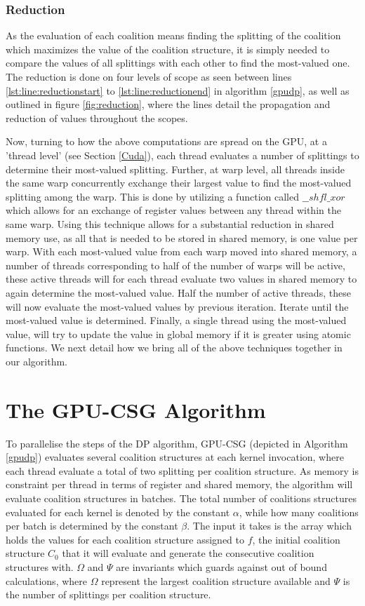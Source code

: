 \documentclass{llncs}
\begin{document}
\subsubsection{Reduction} \label{reduction} %
As the evaluation of each coalition  means finding the splitting  of the coalition  which maximizes the value of the coalition structure, it is simply needed to compare the values of all splittings with each other to find the most-valued one.  The reduction is done on four levels of scope as seen between lines \ref{lst:line:reductionstart} to \ref{lst:line:reductionend} in algorithm \ref{gpudp},
as well as outlined in figure \ref{fig:reduction}, where the lines detail the propagation and reduction of values throughout the scopes.

Now, turning to how the above computations are spread on the GPU, at a 'thread level' (see Section \ref{Cuda}), each thread evaluates a number of splittings to determine their most-valued splitting. Further, at warp level, all threads inside the same warp concurrently exchange their largest value to find the most-valued splitting among the warp. This is done by utilizing a function called $\_\_shfl\_xor$ which allows for an exchange of register values between any thread within the same warp.
Using this technique allows for a substantial reduction in shared memory use, as all that is needed to be stored in shared memory, is one value per warp.  With each most-valued value from each warp moved into shared memory, a number of threads corresponding to half of the number of warps will be active, these active threads will for each thread evaluate two values in shared memory to again determine the most-valued value. Half the number of active threads, these will now evaluate the most-valued values by previous iteration. Iterate until the most-valued value is determined.
Finally, a single thread using the most-valued value, will try to update the value in global memory if it is greater using atomic functions. We next detail how we bring all of the above techniques together in our algorithm.

\section{The GPU-CSG Algorithm}\label{algorithm}
To parallelise the steps of the DP algorithm, GPU-CSG (depicted in Algorithm \ref{gpudp}) evaluates several coalition structures at each kernel invocation, where each thread evaluate a total of two splitting per coalition structure.  As memory is constraint per thread in terms of register and shared memory, the algorithm will evaluate coalition structures in batches. The total number of coalitions structures evaluated for each kernel is denoted by the constant $\alpha$, while how many coalitions per batch is determined by the constant $\beta$. The input it takes is the array which holds the values for each coalition structure assigned to $f$, the initial coalition structure $C_0$ that it will evaluate and generate the consecutive coalition structures with. $\Omega$ and $\Psi$ are invariants which guards against out of bound calculations, where $\Omega$ represent the largest coalition structure available and $\Psi$ is the number of splittings per coalition structure.
\end{document}
